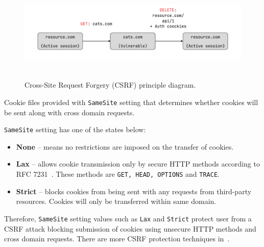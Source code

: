 \begin{figure}[H]
    \centering
    \includegraphics[width=1\textwidth]{img/Csrf_diagram}
    ~\caption{Cross-Site Request Forgery (CSRF) principle diagram.}\label{fig:csrf_diagram}
\end{figure}

Cookie files provided with \texttt{SameSite} setting that determines whether cookies will be sent
along with cross domain requests.

\texttt{SameSite} setting has one of the states below:

\begin{itemize}
    \item \textbf{None} -- means no restrictions are imposed on the transfer of cookies.
    \item \textbf{Lax} -- allows cookie transmission only by secure HTTP methods according to RFC 7231~\cite{fielding2014rfc}.
    These methods are \texttt{GET, HEAD, OPTIONS} and \texttt{TRACE}.
    \item \textbf{Strict} -- blocks cookies from being sent with any requests from third-party resources.
    Cookies will only be transferred within same domain.
\end{itemize}

Therefore, \texttt{SameSite} setting values such as \texttt{Lax} and \texttt{Strict} protect user from a CSRF attack
blocking submission of cookies using unsecure HTTP methods and cross domain requests.
There are more CSRF protection techniques in~\cite{owaspCsrf}.